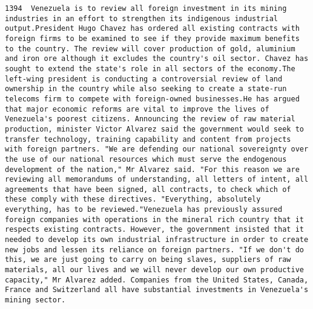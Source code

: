 \documentclass[11pt]{article}
\begin{document}
\begin{Verbatim}[commandchars=\\\{\}]
         1394  Venezuela is to review all foreign investment in its mining industries in an effort to strengthen its indigenous industrial output.President Hugo Chavez has ordered all existing contracts with foreign firms to be examined to see if they provide maximum benefits to the country. The review will cover production of gold, aluminium and iron ore although it excludes the country's oil sector. Chavez has sought to extend the state's role in all sectors of the economy.The left-wing president is conducting a controversial review of land ownership in the country while also seeking to create a state-run telecoms firm to compete with foreign-owned businesses.He has argued that major economic reforms are vital to improve the lives of Venezuela's poorest citizens. Announcing the review of raw material production, minister Victor Alvarez said the government would seek to transfer technology, training capability and content from projects with foreign partners. "We are defending our national sovereignty over the use of our national resources which must serve the endogenous development of the nation," Mr Alvarez said. "For this reason we are reviewing all memorandums of understanding, all letters of intent, all agreements that have been signed, all contracts, to check which of these comply with these directives. "Everything, absolutely everything, has to be reviewed."Venezuela has previously assured foreign companies with operations in the mineral rich country that it respects existing contracts. However, the government insisted that it needed to develop its own industrial infrastructure in order to create new jobs and lessen its reliance on foreign partners. "If we don't do this, we are just going to carry on being slaves, suppliers of raw materials, all our lives and we will never develop our own productive capacity," Mr Alvarez added. Companies from the United States, Canada, France and Switzerland all have substantial investments in Venezuela's mining sector.                                                                                                                                                                                                                                                                                                                                                                                                                                                                                                                                                                                                                                                                                                                                                                                                                                                                                                                                                                                                                                                                                                                                                                                                                                                                                                                                                        
\end{Verbatim}
\end{document}
